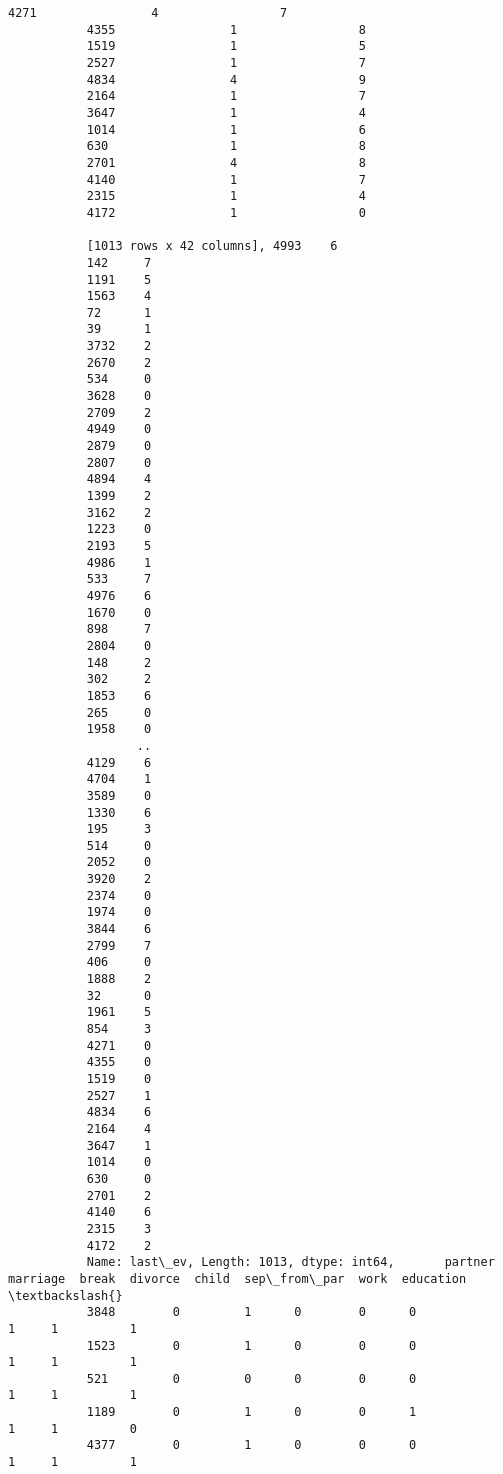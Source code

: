 \documentclass[11pt]{article}
\begin{document}
\begin{Verbatim}[commandchars=\\\{\}]
           4271                4                 7  
           4355                1                 8  
           1519                1                 5  
           2527                1                 7  
           4834                4                 9  
           2164                1                 7  
           3647                1                 4  
           1014                1                 6  
           630                 1                 8  
           2701                4                 8  
           4140                1                 7  
           2315                1                 4  
           4172                1                 0  
           
           [1013 rows x 42 columns], 4993    6
           142     7
           1191    5
           1563    4
           72      1
           39      1
           3732    2
           2670    2
           534     0
           3628    0
           2709    2
           4949    0
           2879    0
           2807    0
           4894    4
           1399    2
           3162    2
           1223    0
           2193    5
           4986    1
           533     7
           4976    6
           1670    0
           898     7
           2804    0
           148     2
           302     2
           1853    6
           265     0
           1958    0
                  ..
           4129    6
           4704    1
           3589    0
           1330    6
           195     3
           514     0
           2052    0
           3920    2
           2374    0
           1974    0
           3844    6
           2799    7
           406     0
           1888    2
           32      0
           1961    5
           854     3
           4271    0
           4355    0
           1519    0
           2527    1
           4834    6
           2164    4
           3647    1
           1014    0
           630     0
           2701    2
           4140    6
           2315    3
           4172    2
           Name: last\_ev, Length: 1013, dtype: int64,       partner  marriage  break  divorce  child  sep\_from\_par  work  education  \textbackslash{}
           3848        0         1      0        0      0             1     1          1   
           1523        0         1      0        0      0             1     1          1   
           521         0         0      0        0      0             1     1          1   
           1189        0         1      0        0      1             1     1          0   
           4377        0         1      0        0      0             1     1          1   

\end{Verbatim}
\end{document}
